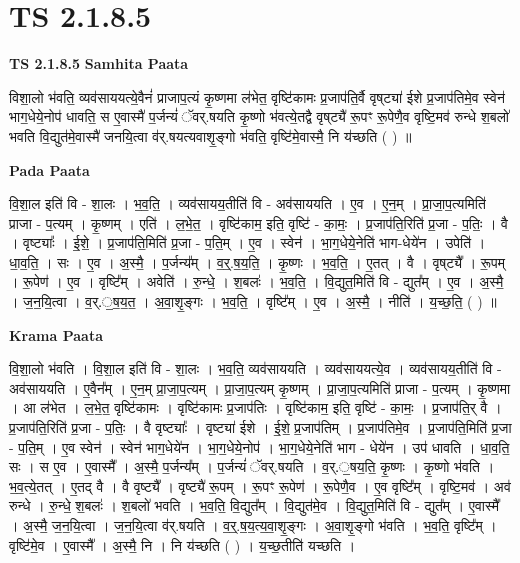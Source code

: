 \documentclass[17pt]{extarticle}
\begin{document}
\section{ TS 2.1.8.5 }

\textbf{TS 2.1.8.5 } \newline
\textbf{Samhita Paata} \newline

विशा॒लो भ॑वति॒ व्यव॑साययत्ये॒वैनं॑ प्राजाप॒त्यं कृ॒ष्णमा ल॑भेत॒ वृष्टि॑कामः प्र॒जाप॑ति॒र्वै वृष्‌ट्या॑ ईशे प्र॒जाप॑तिमे॒व स्वेन॑ भाग॒धेये॒नोप॑ धावति॒ स ए॒वास्मै॑ प॒र्जन्यं॑ ॅवर्.षयति कृ॒ष्णो भ॑वत्ये॒तद्वै वृष्‌ट्यै॑ रू॒पꣳ रू॒पेणै॒व वृष्टि॒मव॑ रुन्धे श॒बलो॑ भवति वि॒द्युत॑मे॒वास्मै॑ जनयि॒त्वा व॑र्.षयत्यवाशृ॒ङ्गो भ॑वति॒ वृष्टि॑मे॒वास्मै॒ नि य॑च्छति ( ) ॥ \newline

\textbf{Pada Paata} \newline

वि॒शा॒ल इति॑ वि - शा॒लः । भ॒व॒ति॒ । व्यव॑सायय॒तीति॑ वि - अव॑साययति । ए॒व । ए॒न॒म् । प्रा॒जा॒प॒त्यमिति॑ प्राजा - प॒त्यम् । कृ॒ष्णम् । एति॑ । ल॒भे॒त॒ । वृष्टि॑काम॒ इति॒ वृष्टि॑ - का॒मः॒ । प्र॒जाप॑ति॒रिति॑ प्र॒जा - प॒तिः॒ । वै । वृष्ट्याः᳚ । ई॒शे॒ । प्र॒जाप॑ति॒मिति॑ प्र॒जा - प॒ति॒म् । ए॒व । स्वेन॑ । भा॒ग॒धेये॒नेति॑ भाग-धेये॑न । उपेति॑ । धा॒व॒ति॒ । सः । ए॒व । अ॒स्मै॒ । प॒र्जन्य᳚म् । व॒र्॒.ष॒य॒ति॒ । कृ॒ष्णः । भ॒व॒ति॒ । ए॒तत् । वै । वृष्‌ट्यै᳚ । रू॒पम् । रू॒पेण॑ । ए॒व । वृष्टि᳚म् । अवेति॑ । रु॒न्धे॒ । श॒बलः॑ । भ॒व॒ति॒ । वि॒द्युत॒मिति॑ वि - द्युत᳚म् । ए॒व । अ॒स्मै॒ । ज॒न॒यि॒त्वा । व॒र्.॒ष॒य॒त॒ । अ॒वा॒शृ॒ङ्गः । भ॒व॒ति॒ । वृष्टि᳚म् । ए॒व । अ॒स्मै॒ । नीति॑ । य॒च्छ॒ति॒ ( ) ॥  \newline


\textbf{Krama Paata} \newline

वि॒शा॒लो भ॑वति । वि॒शा॒ल इति॑ वि - शा॒लः । भ॒व॒ति॒ व्यव॑साययति । व्यव॑साययत्ये॒व । व्यव॑सायय॒तीति॑ वि - अव॑साययति । ए॒वैन᳚म् । ए॒न॒म् प्रा॒जा॒प॒त्यम् । प्रा॒जा॒प॒त्यम् कृ॒ष्णम् । प्रा॒जा॒प॒त्यमिति॑ प्राजा - प॒त्यम् । कृ॒ष्णमा । आ ल॑भेत । ल॒भे॒त॒ वृष्टि॑कामः । वृष्टि॑कामः प्र॒जाप॑तिः । वृष्टि॑काम॒ इति॒ वृष्टि॑ - का॒मः॒ । प्र॒जाप॑ति॒र् वै । प्र॒जाप॑ति॒रिति॑ प्र॒जा - प॒तिः॒ । वै वृष्ट्याः᳚ । वृष्ट्या॑ ईशे । ई॒शे॒ प्र॒जाप॑तिम् । प्र॒जाप॑तिमे॒व । प्र॒जाप॑ति॒मिति॑ प्र॒जा - प॒ति॒म् । ए॒व स्वेन॑ । स्वेन॑ भाग॒धेये॑न । भा॒ग॒धेये॒नोप॑ । भा॒ग॒धेये॒नेति॑ भाग - धेये॑न । उप॑ धावति । धा॒व॒ति॒ सः । स ए॒व । ए॒वास्मै᳚ । अ॒स्मै॒ प॒र्जन्य᳚म् । प॒र्जन्यं॑ ॅवर्.षयति । व॒र्.॒षय॒ति॒ कृ॒ष्णः । कृ॒ष्णो भ॑वति । भ॒व॒त्ये॒तत् । ए॒तद् वै । वै वृष्ट्यै᳚ । वृष्ट्यै॑ रू॒पम् । रू॒पꣳ रू॒पेण॑ । रू॒पेणै॒व । ए॒व वृष्टि᳚म् । वृष्टि॒मव॑ । अव॑ रुन्धे । रु॒न्धे॒ श॒बलः॑ । श॒बलो॑ भवति । भ॒व॒ति॒ वि॒द्युत᳚म् । वि॒द्युत॑मे॒व । वि॒द्युत॒मिति॑ वि - द्युत᳚म् । ए॒वास्मै᳚ । अ॒स्मै॒ ज॒न॒यि॒त्वा । ज॒न॒यि॒त्वा व॑र्.षयति । व॒र्॒.ष॒य॒त्य॒वा॒शृ॒ङ्गः । अ॒वा॒शृ॒ङ्गो भ॑वति । भ॒व॒ति॒ वृष्टि᳚म् । वृष्टि॑मे॒व । ए॒वास्मै᳚ । अ॒स्मै॒ नि । नि य॑च्छति ( ) । य॒च्छ॒तीति॑ यच्छति । \newline
\end{document}
